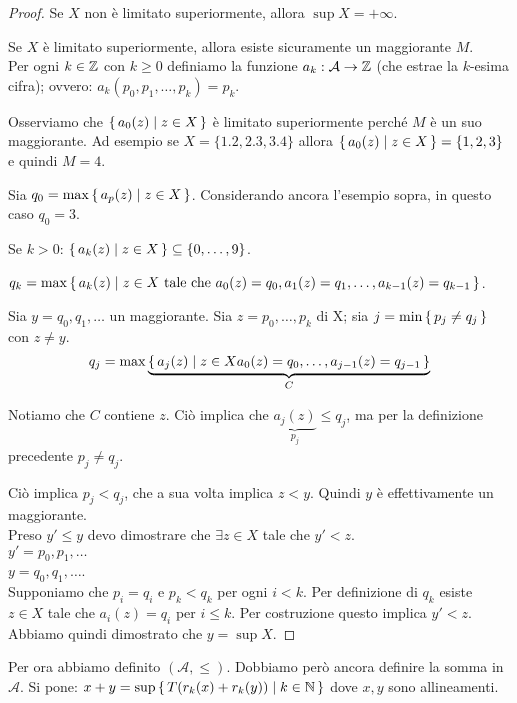 \begin{proof}
Se $X$ non è limitato superiormente, allora $\sup X = +\infty$.

Se $X$ è limitato superiormente, allora esiste sicuramente un maggiorante $M$. \\
Per ogni $k \in \mathbb Z$ con $k \ge 0$ definiamo la funzione $a_k : \mathcal{A} \rightarrow \mathbb Z$ (che estrae la $k$-esima cifra); ovvero: $a_k(p_0, p_1, \dots, p_k) = p_k$.

Osserviamo che $\set{a_0(z) | z \in X}$ è limitato superiormente perché $M$ è un suo maggiorante. Ad esempio se $X = \{1.2, 2.3, 3.4 \}$ allora $\set{a_0(z) | z \in X} = \{1, 2, 3\}$ e quindi $M = 4$.

Sia $q_0 = \max \set{a_p(z) | z \in X}$. Considerando ancora l'esempio sopra, in questo caso $q_0 = 3$.

Se $k > 0$: $\set{a_k(z) | z \in X} \subseteq \{0, \dots, 9\}$.

$q_k = \max \set{a_k(z) | z \in X \text{ tale che } a_0(z)=q_0, a_1(z)=q_1, \dots, a_{k-1}(z) = q_{k-1}}$.

Sia $y = q_0, q_1, \dots$ un maggiorante.
Sia $z = p_0, \dots, p_k$ di X; sia $j = \min \set{p_j \neq q_j}$ con $z \neq y$.
\begin{equation*}
q_j = \max \underbrace{\set{a_j(z) | z \in X a_0(z) = q_0, \dots, a_{j-1}(z) = q_{j-1}}}_{C}
\end{equation*}

Notiamo che $C$ contiene $z$. Ciò implica che $\underbrace{a_j(z)}_{p_j} \le q_j$, ma per la definizione precedente $p_j \neq q_j$. 

Ciò implica $p_j < q_j$, che a sua volta implica $z < y$. Quindi $y$ è effettivamente un maggiorante. \\

Preso $y' \le y$ devo dimostrare che $\exists z \in X$ tale che $y' < z$. \\
$y' = p_0, p_1, \dots$ \\
$y = q_0, q_1, \dots$.\\
Supponiamo che $p_i = q_i$ e $p_k < q_k$ per ogni $i < k$. Per definizione di $q_k$ esiste $z \in X$ tale che $a_i(z) = q_i$ per $i \le k$. Per costruzione questo implica $y' < z$. Abbiamo quindi dimostrato che $y = \sup X$.
\end{proof}

Per ora abbiamo definito $(\mathcal{A}, \le)$. Dobbiamo però ancora definire la somma in $\mathcal{A}$. Si pone: $x + y = \sup \set{T(r_k(x)+r_k(y)) | k \in \mathbb N}$ dove $x, y$ sono allineamenti. 

